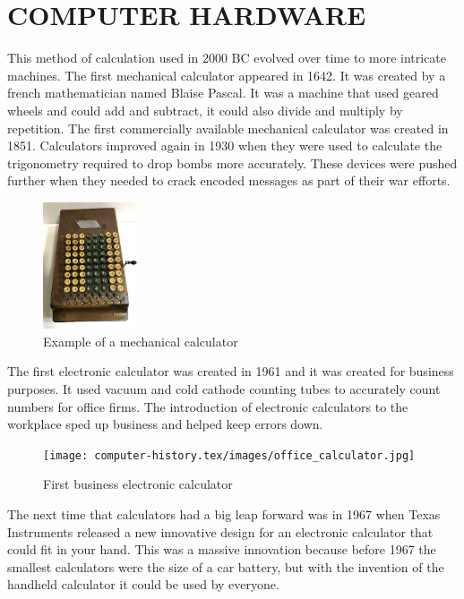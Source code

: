 \documentclass[letterpaper, 10 pt, conference]{IEEEconf}
\begin{document}
\section{COMPUTER HARDWARE}
This method of calculation used in 2000 BC evolved over time
to more intricate machines. The first mechanical calculator
appeared in 1642. It was created by a french mathematician
named Blaise Pascal. It was a machine that used geared wheels
and could add and subtract, it could also divide and multiply
by repetition. 
The first commercially available mechanical calculator was
created in 1851. Calculators improved again in 1930 when they
were used to calculate the trigonometry required to drop bombs
more accurately. These devices were pushed further when they
needed to crack encoded messages as part of their war efforts.

\begin{figure}[h!]
\centering
\includegraphics[width=0.25\textwidth]{mechanical_calculator.jpg}
\caption{Example of a mechanical calculator}
\label{fig:example}
\end{figure}

The first electronic calculator was created in 1961 and it was
created for business purposes. It used vacuum and cold cathode
counting tubes to accurately count numbers for office firms.
The introduction of electronic calculators to the workplace
sped up business and helped keep errors down.

\begin{figure}[h!]
\centering
\texttt{[image: computer-history.tex/images/office\_calculator.jpg]}
\caption{First business electronic calculator}
\label{fig:example}
\end{figure}

The next time that calculators had a big leap forward was in 1967 when Texas Instruments released a new innovative design for an electronic calculator that could fit in your hand. This was a massive innovation because before 1967 the smallest calculators were the size of a car battery, but with the invention of the handheld calculator it could be used by everyone.
\end{document}
